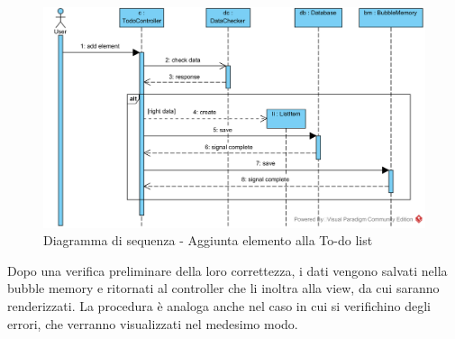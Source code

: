 \begin{figure}[H]
	\centering
	\includegraphics[width=14cm]{diagrammi_img/sequenza/todo_aggiungi_elemento.png}
	\caption{Diagramma di sequenza - Aggiunta elemento alla To-do list}
\end{figure}
Dopo una verifica preliminare della loro correttezza, i dati vengono salvati nella bubble memory e ritornati al controller che li inoltra alla view, da cui saranno renderizzati.
La procedura è analoga anche nel caso in cui si verifichino degli errori, che verranno visualizzati nel medesimo modo.


